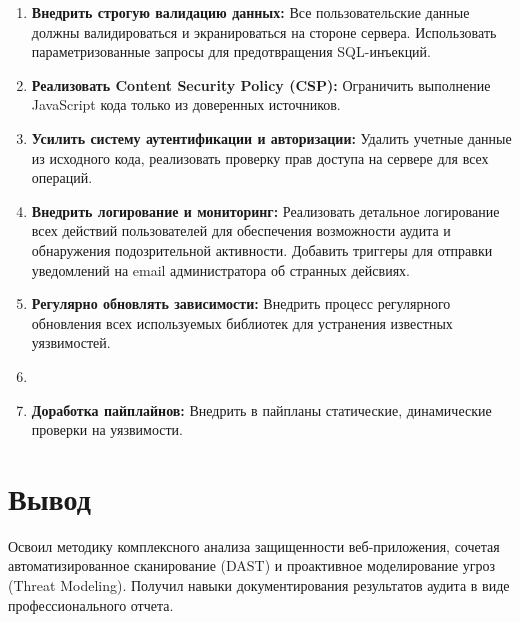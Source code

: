 \documentclass{article}
\begin{document}
\begin{enumerate}
    \item \textbf{Внедрить строгую валидацию данных:} Все пользовательские данные должны валидироваться и экранироваться на стороне сервера. Использовать параметризованные запросы для предотвращения SQL-инъекций.
    
    \item \textbf{Реализовать Content Security Policy (CSP):} Ограничить выполнение JavaScript кода только из доверенных источников.
    
    \item \textbf{Усилить систему аутентификации и авторизации:} Удалить учетные данные из исходного кода, реализовать проверку прав доступа на сервере для всех операций.
    
    \item \textbf{Внедрить логирование и мониторинг:} Реализовать детальное логирование всех действий пользователей для обеспечения возможности аудита и обнаружения подозрительной активности. Добавить триггеры для отправки уведомлений на email администратора об странных дейсвиях.
    
    \item \textbf{Регулярно обновлять зависимости:} Внедрить процесс регулярного обновления всех используемых библиотек для устранения известных уязвимостей.
    \item 
    \item \textbf{Доработка пайплайнов:} Внедрить в пайпланы статические, динамические проверки на уязвимости.
\end{enumerate}

\section*{Вывод}

Освоил методику комплексного анализа защищенности веб-приложения, сочетая
автоматизированное сканирование (DAST) и проактивное моделирование угроз (Threat Modeling).
Получил навыки документирования результатов аудита в виде профессионального отчета.
\end{document}
